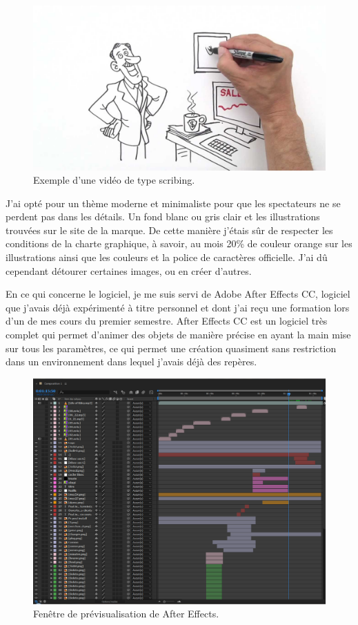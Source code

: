\begin{figure}[htp]
  \centering
  \includegraphics[width=15cm]{images/scribe}
  \caption{Exemple d'une vidéo de type scribing.}
  \label{scribe}
\end{figure}

J'ai opté pour un thème moderne et minimaliste pour que les spectateurs ne se perdent pas dans les détails. Un fond blanc ou gris clair et les illustrations trouvées sur le site de la marque. De cette manière j'étais sûr de respecter les conditions de la charte graphique, à savoir, au mois 20\% de couleur orange sur les illustrations ainsi que les couleurs et la police de caractères officielle. J'ai dû cependant détourer certaines images, ou en créer d'autres.

En ce qui concerne le logiciel, je me suis servi de Adobe After Effects CC, logiciel que j'avais déjà expérimenté à titre personnel et dont j'ai reçu une formation lors d'un de mes cours du premier semestre. After Effects CC est un logiciel très complet qui permet d'animer des objets de manière précise en ayant la main mise sur tous les paramètres, ce qui permet une création quasiment sans restriction dans un environnement dans lequel j'avais déjà des repères.


\begin{figure}[htp]
  \centering
  \includegraphics[width=15cm]{images/comp1.png}
  \caption{Fenêtre de prévisualisation de After Effects.}
  \label{ae1}
\end{figure}




